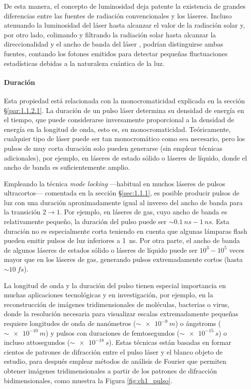 De esta manera, el concepto de luminosidad deja patente la existencia de grandes diferencias entre las fuentes de radiación convencionales y los láseres. Incluso atenuando la luminosidad del láser  hasta alcanzar el valor de la radiación solar y, por otro lado, colimando y filtrando la radiación solar hasta alcanzar la direccionalidad y el ancho de banda del láser , podrían distinguirse ambas fuentes, contando los fotones emitidos para detectar pequeñas fluctuaciones estadísticas debidas a la naturaleza cuántica de la luz. 

\paragraph{Duración}\label{par:1.1.2.5}
Esta propiedad está relacionada con la monocromaticidad explicada en la sección \S\ref{par:1.1.2.1}. La duración de un pulso láser determina su densidad de energía en el tiempo, que puede considerarse inversamente proporcional a la densidad de energía en la longitud de onda, esto es, su monocromaticidad\autocite{Svelto2010}. Teóricamente, cualquier tipo de láser puede ser tan monocromático como sea necesario, pero los pulsos de muy corta duración solo pueden generarse (sin emplear técnicas adicionales), por ejemplo, en láseres de estado sólido o láseres de líquido, donde el ancho de banda es suficientemente amplio.

Empleando la técnica \emph{mode locking} ---habitual en muchos láseres de pulsos ultracortos--- comentada en la sección \S\ref{sec:1.1.1}, es posible producir pulsos de luz con una duración aproximadamente igual al inverso del ancho de banda para la transición $2 \rightarrow 1$. Por ejemplo, en láseres de gas, cuyo ancho de banda es relativamente pequeño, la duración del pulso puede ser $\sim\qty{0,1}{ns}-\qty{1}{ns}$. Esta duración no es especialmente corta teniendo en cuenta que algunas lámparas flash pueden emitir pulsos de luz inferiores a \qty{1}{ns}. Por otra parte, el ancho de banda de algunos láseres de estados sólido o láseres de líquido puede ser $10^3-10^5$ veces mayor que en los láseres de gas, generando pulsos extremadamente cortos (hasta $\sim\qty{10}{fs}$).

La longitud de onda y la duración del pulso tienen especial importancia en muchas aplicaciones tecnológicas y en investigación, por ejemplo, en la reconstrucción de imágenes tridimensionales de moléculas\autocite{vonArdenne2018}, bacterias o virus\autocite{Ekeberg2015}, donde la resolución necesaria para visualizar escalas extremadamente pequeñas requiere longitudes de onda de nanómetros ($\sim\qty{e-9}{m}$) o ángstroms ($\sim\qty{e-10}{m}$) y pulsos con duraciones de femtosegundos ($\sim\qty{e-15}{s}$) o incluso attosegundos ($\sim\qty{e-18}{s}$). Estas técnicas están basadas en formar cientos de patrones de difracción entre el pulso láser y el blanco objeto de estudio, para después emplear métodos de análisis de Fourier que permiten obtener imágenes tridimensionales a partir de los patrones de difracción bidimensionales, como muestra la Figura \ref{fig:ch1_pulso}.

